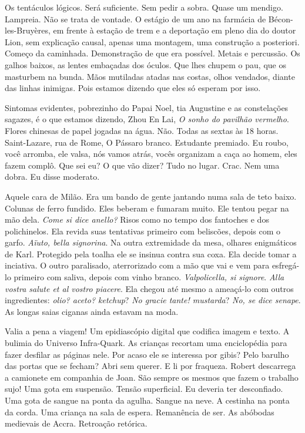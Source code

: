 Os tentáculos lógicos. Será suficiente. Sem pedir a sobra. Quase um
mendigo. Lampreia. Não se trata de vontade. O estágio de um ano na
farmácia de Bécon-les-Bruyères, em frente à estação de trem e a
deportação em pleno dia do doutor Lion, sem explicação causal, apenas
uma montagem, uma construção a posteriori. Começo da caminhada.
Demonstração de que era possível. Metais e percussão. Os galhos baixos,
as lentes embaçadas dos óculos. Que lhes chupem o pau, que os masturbem
na bunda. Mãos mutiladas atadas nas costas, olhos vendados, diante das
linhas inimigas. Pois estamos dizendo que eles só esperam por isso.

Sintomas evidentes, pobrezinho do Papai Noel, tia Augustine e as
constelações sagazes, é o que estamos dizendo, Zhou En Lai, \emph{O
sonho do pavilhão vermelho}. Flores chinesas de papel jogadas na água.
Não. Todas as sextas às 18 horas. Saint-Lazare, rua de Rome, O Pássaro
branco. Estudante premiado. Eu roubo, você arromba, ele valsa, nós vamos
atrás, vocês organizam a caça ao homem, eles fazem complô. Que sei eu? O
que vão dizer? Tudo no lugar. Crac. Nem uma dobra. Eu disse moderato.

Aquele cara de Milão. Era um bando de gente jantando numa sala de teto
baixo. Colunas de ferro fundido. Eles beberam e fumaram muito. Ele
tentou pegar na mão dela. \emph{Come si dice anello?} Risos como no
tempo dos fantoches e dos polichinelos. Ela revida suas tentativas
primeiro com beliscões, depois com o garfo. \emph{Aïuto, bella
signorina}. Na outra extremidade da mesa, olhares enigmáticos de Karl.
Protegido pela toalha ele se insinua contra sua coxa. Ela decide tomar a
inciativa. O outro paralisado, aterrorizado com a mão que vai e vem para
esfregá-lo primeiro com saliva, depois com vinho branco.
\emph{Valpolicella, si signore}. \emph{Alla vostra salute et al vostro
piacere}. Ela chegou até mesmo a ameaçá-lo com outros ingredientes:
\emph{olio? aceto? ketchup}? \emph{No gracie tante! mustarda}? \emph{No,
se dice senape}. As longas saias ciganas ainda estavam na moda.

Valia a pena a viagem! Um epidiascópio digital que codifica imagem e
texto. A bulimia do Universo Infra-Quark. As crianças recortam uma
enciclopédia para fazer desfilar as páginas nele. Por acaso ele se
interessa por gibis? Pelo barulho das portas que se fecham? Abri sem
querer. E li por fraqueza. Robert descarrega a camionete em companhia de
Joan. São sempre os mesmos que fazem o trabalho sujo! Uma gota em
suspensão. Tensão superficial. Eu deveria ter desconfiado. Uma gota de
sangue na ponta da agulha. Sangue na neve. A cestinha na ponta da corda.
Uma criança na sala de espera. Remanência de ser. As abóbodas medievais
de Accra. Retroação retórica.

